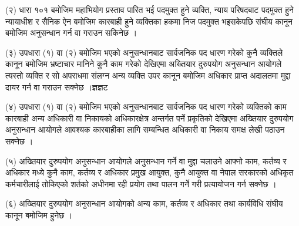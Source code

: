 (२) धारा १०१ बमोजिम महाभियोग प्रस्ताव पारित भई पदमुक्त हुने व्यक्ति, न्याय परिषदबाट पदमुक्त हुने न्यायाधीश र सैनिक ऐन बमोजिम कारबाही हुने व्यक्तिका हकमा निज पदमुक्त भइसकेपछि संघीय कानून बमोजिम अनुसन्धान गर्न वा गराउन सकिनेछ ।

(३) उपधारा (१) वा (२) बमोजिम भएको अनुसन्धानबाट सार्वजनिक पद धारण गरेको कुनै व्यक्तिले कानून बमोजिम भ्रष्टाचार मानिने कुनै काम गरेको देखिएमा अख्तियार दुरुपयोग अनुसन्धान आयोगले त्यस्तो व्यक्ति र सो अपराधमा संलग्न अन्य व्यक्ति उपर कानून बमोजिम अधिकार प्राप्त अदालतमा मुद्दा दायर गर्न वा गराउन सक्नेछ ।ज्ञज्ञट

(४) उपधारा (१) वा (२) बमोजिम भएको अनुसन्धानबाट सार्वजनिक पद धारण गरेको व्यक्तिको काम कारबाही अन्य अधिकारी वा निकायको अधिकारक्षेत्र अन्तर्गत पर्ने प्रकृतिको देखिएमा अख्तियार दुरुपयोग अनुसन्धान आयोगले आवश्यक कारबाहीका लागि सम्बन्धित अधिकारी वा निकाय समक्ष लेखी पठाउन सक्नेछ ।

(५) अख्तियार दुरुपयोग अनुसन्धान आयोगले अनुसन्धान गर्ने वा मुद्दा चलाउने आफ्नो काम, कर्तव्य र अधिकार मध्ये कुनै काम, कर्तव्य र अधिकार प्रमुख आयुक्त, कुनै आयुक्त वा नेपाल सरकारको अधिकृत कर्मचारीलाई तोकिएको शर्तको अधीनमा रही प्रयोग तथा पालन गर्ने गरी प्रत्यायोजन गर्न सक्नेछ ।

(६) अख्तियार दुरुपयोग अनुसन्धान आयोगको अन्य काम, कर्तव्य र अधिकार तथा कार्यविधि संघीय कानून बमोजिम हुनेछ ।